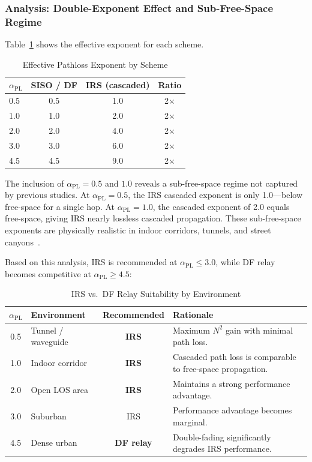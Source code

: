 \documentclass[journal]{IEEEtran} %
\begin{document}
\subsubsection{Analysis: Double-Exponent Effect and Sub-Free-Space Regime}

Table~\ref{tab:effective_exponent} shows the effective exponent for each scheme.

\begin{table}[t]
\centering
\caption{Effective Pathloss Exponent by Scheme}
\label{tab:effective_exponent}
\begin{tabular}{@{}lccc@{}}
\toprule
$\alpha_{\mathrm{PL}}$ & SISO / DF & IRS (cascaded) & Ratio \\
\midrule
0.5 & 0.5 & 1.0 & 2$\times$ \\
1.0 & 1.0 & 2.0 & 2$\times$ \\
2.0 & 2.0 & 4.0 & 2$\times$ \\
3.0 & 3.0 & 6.0 & 2$\times$ \\
4.5 & 4.5 & 9.0 & 2$\times$ \\
\bottomrule
\end{tabular}
\end{table}

The inclusion of $\alpha_{\mathrm{PL}} = 0.5$ and $1.0$ reveals a sub-free-space regime not captured by previous studies. At $\alpha_{\mathrm{PL}} = 0.5$, the IRS cascaded exponent is only 1.0---below free-space for a single hop. At $\alpha_{\mathrm{PL}} = 1.0$, the cascaded exponent of 2.0 equals free-space, giving IRS nearly lossless cascaded propagation. These sub-free-space exponents are physically realistic in indoor corridors, tunnels, and street canyons~\cite{rappaport2015mmwave,molisch2006channel}.

Based on this analysis, IRS is recommended at $\alpha_{\mathrm{PL}} \leq 3.0$, while DF relay becomes competitive at $\alpha_{\mathrm{PL}} \geq 4.5$:

\begin{table}[t]
\centering
\footnotesize
\caption{IRS vs.\ DF Relay Suitability by Environment}
\label{tab:env_suitability}

\begin{tabularx}{\columnwidth}{@{}cXcX@{}}
\toprule
$\alpha_{\mathrm{PL}}$ & Environment & Recommended & Rationale \\
\midrule
0.5 & Tunnel / waveguide & \textbf{IRS} & Maximum $N^2$ gain with minimal path loss. \\
1.0 & Indoor corridor & \textbf{IRS} & Cascaded path loss is comparable to free-space propagation. \\
2.0 & Open LOS area & \textbf{IRS} & Maintains a strong performance advantage. \\
3.0 & Suburban & IRS & Performance advantage becomes marginal. \\
4.5 & Dense urban & \textbf{DF relay} & Double-fading significantly degrades IRS performance. \\
\bottomrule
\end{tabularx}

\end{table}
\end{document}
